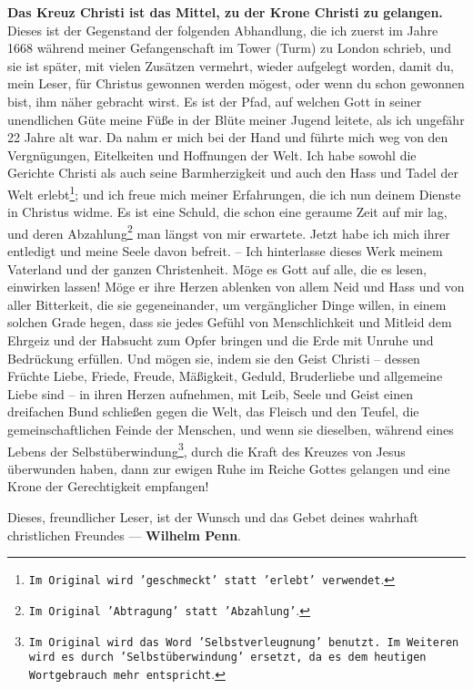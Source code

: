 \textbf{Das Kreuz Christi ist das Mittel, zu der Krone Christi zu gelangen.}
Dieses ist der Gegenstand der folgenden Abhandlung, die ich zuerst im Jahre 1668
während meiner Gefangenschaft  im Tower (Turm) zu London
 schrieb, und sie ist später, mit vielen Zusätzen vermehrt, wieder
aufgelegt worden, damit du, mein Leser, für Christus gewonnen werden mögest,
oder wenn du schon gewonnen bist, ihm näher gebracht wirst. Es ist der Pfad, auf
welchen Gott in seiner unendlichen Güte meine Füße in der Blüte meiner Jugend
leitete, als ich ungefähr 22 Jahre alt war. Da nahm er mich bei der Hand und
führte mich weg von den Vergnügungen, Eitelkeiten und Hoffnungen der Welt. Ich
habe sowohl die Gerichte Christi als auch seine Barmherzigkeit und auch den
Hass und Tadel der Welt erlebt\footnote{\texttt{Im Original wird 'geschmeckt'
statt 'erlebt' verwendet}.}; und ich freue mich meiner Erfahrungen, die ich nun
deinem
Dienste in Christus widme. Es ist eine Schuld, die schon eine geraume Zeit auf
mir lag, und deren Abzahlung\footnote{\texttt{Im Original 'Abtragung' statt
'Abzahlung'}.} man längst von mir erwartete. Jetzt habe ich mich ihrer
entledigt und meine Seele davon befreit. -- Ich hinterlasse dieses Werk meinem
Vaterland und der ganzen Christenheit. Möge es Gott auf alle, die es lesen,
einwirken lassen! Möge er ihre Herzen ablenken von allem Neid und Hass und von
aller Bitterkeit, die sie gegeneinander, um vergänglicher Dinge willen, in
einem solchen Grade hegen, dass sie jedes Gefühl von Menschlichkeit und Mitleid
dem Ehrgeiz und der Habsucht zum Opfer bringen und die Erde mit Unruhe und
Bedrückung erfüllen. Und mögen sie, indem sie den Geist Christi -- dessen
Früchte Liebe, Friede, Freude, Mäßigkeit, Geduld, Bruderliebe und allgemeine
Liebe sind -- in ihren Herzen aufnehmen, mit Leib, Seele und Geist einen
dreifachen Bund schließen gegen die Welt, das Fleisch und den Teufel, die
gemeinschaftlichen Feinde der Menschen, und wenn sie dieselben, während eines
Lebens der Selbstüberwindung\footnote{\texttt{Im Original wird das Word
'Selbstverleugnung' benutzt. Im Weiteren wird es durch 'Selbstüberwindung'
ersetzt, da es dem heutigen Wortgebrauch mehr entspricht}.}, durch die Kraft des
Kreuzes von Jesus überwunden haben, dann zur ewigen Ruhe im Reiche Gottes
gelangen und eine Krone der Gerechtigkeit empfangen!


\medskip

Dieses, freundlicher Leser, ist der Wunsch und das Gebet deines wahrhaft
christlichen Freundes --- \textbf{Wilhelm Penn}.


